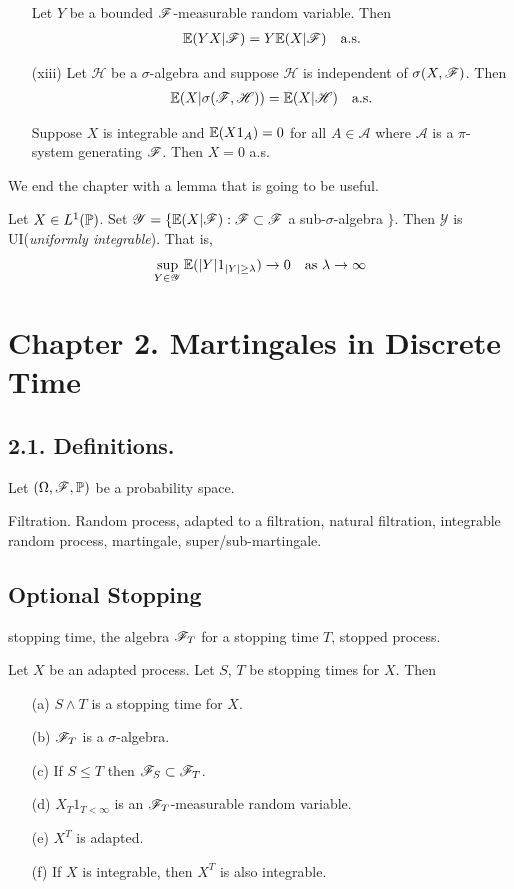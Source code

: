 \documentclass[10pt,a4paper]{report}
\begin{document}
\begin{itemize}
Let $Y$ be a bounded $\mathscr{F}$-measurable random variable. Then 
\begin{align*}
\mathbb{E}(YX|\mathscr{F})  = Y\mathbb{E}(X|\mathscr{F}) \quad \text{a.s.}
\end{align*}
\item[(xiii)] Let $\mathscr{H}$ be a $\sigma$-algebra and suppose $\mathscr{H}$ is independent of $\sigma(X,\mathscr{F})$. Then
\begin{align*}
\mathbb{E}(X|\sigma(\mathscr{F}, \mathscr{H})) = \mathbb{E}(X|\mathscr{H}) \quad \text{a.s.}
\end{align*}
\s

\lem Suppose $X$ is integrable and $\mathbb{E}(X1_A) = 0$ for all $A\in \mathscr{A}$ where $\mathscr{A}$ is a $\pi$-system generating $\mathscr{F}$. Then $X=0$ a.s.
\end{itemize}
\s

We end the chapter with a lemma that is going to be useful.
\s

 Let $X\in L^1(\mathbb{P})$. Set $\mathcal{Y} = \{\mathbb{E}(X|\mathscr{F}) : \mathscr{F} \subset \mathscr{F}$ a sub-$\sigma$-algebra $\}$. Then $\mathcal{Y}$ is UI(\emph{uniformly integrable}). That is,
\begin{align*}
\sup_{Y \in \mathcal{Y}} \mathbb{E}(|Y| 1_{|Y|\geq \lambda}) \rightarrow 0 \quad \text{as } \lambda \rightarrow \infty
\end{align*}

\section*{Chapter 2. Martingales in Discrete Time}

\subsection*{2.1. Definitions.}

Let $(\Omega, \mathscr{F}, \mathbb{P})$ be a probability space.

Filtration. Random process, adapted to a filtration, natural filtration, integrable random process, martingale, super/sub-martingale.

\subsection*{Optional Stopping}

stopping time, the algebra $\mathscr{F}_T$ for a stopping time $T$, stopped process.
\s

 Let $X$ be an adapted process. Let $S$, $T$ be stopping times for $X$. Then
\begin{itemize}
\item[(a)] $S\wedge T$ is a stopping time for $X$.
\item[(b)] $\mathscr{F}_T$ is a $\sigma$-algebra.
\item[(c)] If $S\leq T$ then $\mathscr{F}_S \subset \mathscr{F}_T$.
\item[(d)] $X_T 1_{T<\infty}$ is an $\mathscr{F}_T$-measurable random variable.
\item[(e)] $X^T$ is adapted.
\item[(f)] If $X$ is integrable, then $X^T$ is also integrable.
\end{itemize}
\s
\end{document}
